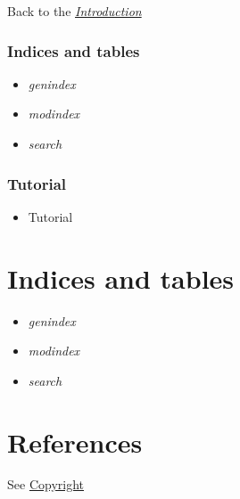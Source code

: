 \documentclass[letterpaper,10pt,english]{sphinxmanual}
\begin{document}
Back to the {\hyperref[techDoc:technical-label]{\emph{Introduction}}}


\subsection{Indices and tables}
\label{techDoc:indices-and-tables}\begin{itemize}
\item {} 
\emph{genindex}

\item {} 
\emph{modindex}

\item {} 
\emph{search}

\end{itemize}


\subsection{Tutorial}
\label{techDoc:tutorial}\begin{itemize}
\item {} 
Tutorial

\end{itemize}


\chapter{Indices and tables}
\label{index:indices-and-tables}\begin{itemize}
\item {} 
\emph{genindex}

\item {} 
\emph{modindex}

\item {} 
\emph{search}

\end{itemize}


\chapter{References}
\label{index:references}
See \href{http://leopold-loewenheim.uni.lu/Digraph3/digraph3\_copyright.html}{Copyright}
\end{document}
